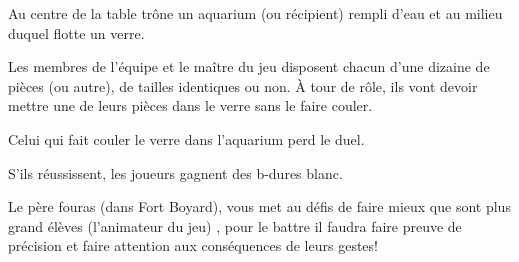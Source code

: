 \documentclass{grand-jeu}
\begin{document}
\begin{liste-materiel}
\end{liste-materiel}

\begin{regles}
Au centre de la table trône un aquarium (ou récipient) rempli d'eau et au milieu duquel flotte un verre.

Les membres de l'équipe et le maître du jeu disposent chacun d'une dizaine de pièces (ou autre), de tailles identiques ou non. À tour de rôle, ils vont devoir mettre une de leurs pièces dans le verre sans le faire couler. 

Celui qui fait couler le verre dans l'aquarium perd le duel.

S’ils réussissent, les joueurs gagnent des b-dures blanc. 
\end{regles}

\begin{imaginaire}
Le père fouras (dans Fort Boyard), vous met au défis de faire mieux que sont plus grand élèves (l'animateur du jeu) , pour le battre il faudra faire preuve de précision et faire attention aux conséquences de leurs gestes! 
\end{imaginaire}

\begin{moments-stop}
\end{moments-stop}
\end{document}
